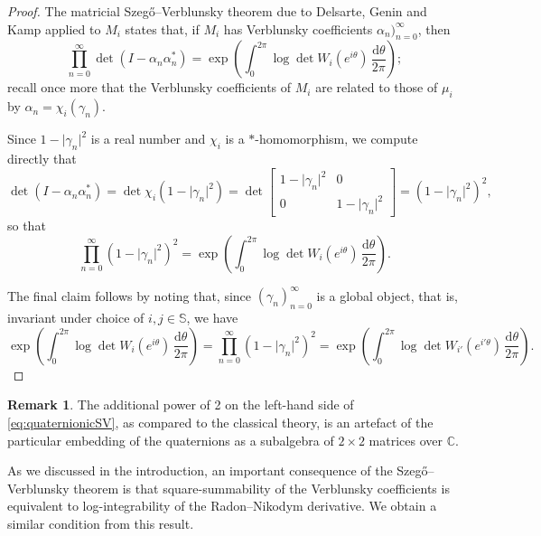 \documentclass[11pt,reqno]{amsart}
\def\a{\alpha}
\def\x{\chi}
\def\g{\gamma}
\def\th{\theta}
\def\rmd{\mathrm{d}}
\def\CC{\mathbb{C}}
\def\SS{\mathbb{S}}
\theoremstyle{definition}
\newtheorem{remark}[theorem]{Remark}
\numberwithin{equation}{section}
\begin{document}
\begin{proof}
    The matricial Szeg\H{o}--Verblunsky theorem due to Delsarte, Genin and Kamp \cite{DGK78} applied to \(M_i\) states that, if \(M_i\) has Verblunsky coefficients \(\a_n)_{n=0}^{\infty}\), then
    \[
        \prod_{n=0}^{\infty} \det (I - \a_n\a_n^*) = \exp\left(\int_0^{2\pi} \log \det W_i(e^{i\th}) \, \frac{\rmd\th}{2\pi}\right);
    \]
    recall once more that the Verblunsky coefficients of \(M_i\) are related to those of \(\mu_i\) by \(\a_n = \x_i(\g_n)\).
    
    Since \(1 - \lvert\g_n\rvert^2\) is a real number and \(\x_i\) is a \(*\)-homomorphism, we compute directly that
    \[
        \det( I - \a_n\a_n^* ) = \det \x_i(1 - \lvert \g_n \rvert^2) = \det \begin{bmatrix} 1 - \lvert \g_n \rvert^2 & 0 \\ 0 & 1 - \lvert \g_n \rvert^2 \end{bmatrix} = (1 - \lvert \g_n \rvert^2)^2,
    \]
    so that
    \[
        \prod_{n=0}^{\infty} (1 - \lvert \g_n \rvert^2)^2 = \exp\left(\int_0^{2\pi} \log \det W_i(e^{i\th}) \, \frac{\rmd\th}{2\pi}\right).
    \]

    The final claim follows by noting that, since \((\g_n)_{n=0}^{\infty}\) is a global object, that is, invariant under choice of \(i,j\in\SS\), we have
    \[
        \exp\left(\int_0^{2\pi} \log \det W_i(e^{i\th}) \, \frac{\rmd\th}{2\pi}\right) = \prod_{n=0}^{\infty} (1 - \lvert \g_n \rvert^2)^2 = \exp\left(\int_0^{2\pi} \log \det W_{i'}(e^{i' \th}) \, \frac{\rmd\th}{2\pi}\right).
    \]
\end{proof}

\begin{remark}
    The additional power of 2 on the left-hand side of \eqref{eq:quaternionicSV}, as compared to the classical theory, is an artefact of the particular embedding of the quaternions as a subalgebra of \(2 \times 2\) matrices over \(\CC\).
\end{remark}

As we discussed in the introduction, an important consequence of the Szeg\H{o}--Verblunsky theorem is that square-summability of the Verblunsky coefficients is equivalent to log-integrability of the Radon--Nikodym derivative. We obtain a similar condition from this result.
\end{document}
